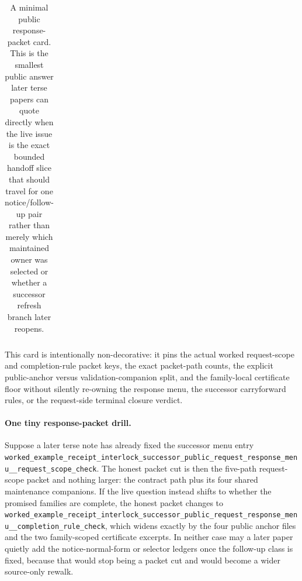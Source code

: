 \documentclass[11pt]{article}
\begin{document}
\begin{table}[t]
\begin{tabularx}{\linewidth}{@{}l X@{}}
\bottomrule
\end{tabularx}
\caption{A minimal public response-packet card. This is the smallest public answer later terse papers can quote directly when the live issue is the exact bounded handoff slice that should travel for one notice/follow-up pair rather than merely which maintained owner was selected or whether a successor refresh branch later reopens.}
\label{tab:minimal-public-response-packet-card}
\end{table}

This card is intentionally non-decorative: it pins the actual worked request-scope and completion-rule packet keys, the exact packet-path counts, the explicit public-anchor versus validation-companion split, and the family-local certificate floor without silently re-owning the response menu, the successor carryforward rules, or the request-side terminal closure verdict.\cite{series:workedexample}

\paragraph{One tiny response-packet drill.}
Suppose a later terse note has already fixed the successor menu entry \nolinkurl{worked_example_receipt_interlock_successor_public_request_response_menu__request_scope_check}. The honest packet cut is then the five-path request-scope packet and nothing larger: the contract path plus its four shared maintenance companions. If the live question instead shifts to whether the promised families are complete, the honest packet changes to \nolinkurl{worked_example_receipt_interlock_successor_public_request_response_menu__completion_rule_check}, which widens exactly by the four public anchor files and the two family-scoped certificate excerpts. In neither case may a later paper quietly add the notice-normal-form or selector ledgers once the follow-up class is fixed, because that would stop being a packet cut and would become a wider source-only rewalk.\cite{series:workedexample}
\end{document}
